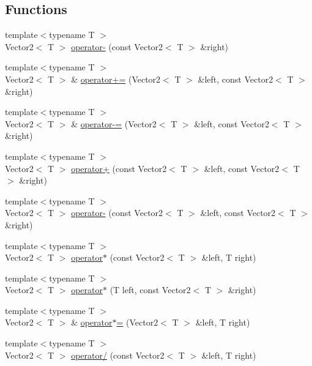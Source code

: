 \subsection*{Functions}
\begin{DoxyCompactItemize}
\item 
{\footnotesize template$<$typename T $>$ }\\Vector2$<$ T $>$ \hyperlink{_vector2_8inl_af6be5729d510689ad3bda16e2ee1052e}{operator-\/} (const Vector2$<$ T $>$ \&right)
\item 
{\footnotesize template$<$typename T $>$ }\\Vector2$<$ T $>$ \& \hyperlink{_vector2_8inl_a52734531787801fca563b63877cf8855}{operator+=} (Vector2$<$ T $>$ \&left, const Vector2$<$ T $>$ \&right)
\item 
{\footnotesize template$<$typename T $>$ }\\Vector2$<$ T $>$ \& \hyperlink{_vector2_8inl_a6dc66f95d609a2280bc5d0e8dc1871ec}{operator-\/=} (Vector2$<$ T $>$ \&left, const Vector2$<$ T $>$ \&right)
\item 
{\footnotesize template$<$typename T $>$ }\\Vector2$<$ T $>$ \hyperlink{_vector2_8inl_a629b6b51cf4ef3d9bef1b471096535c1}{operator+} (const Vector2$<$ T $>$ \&left, const Vector2$<$ T $>$ \&right)
\item 
{\footnotesize template$<$typename T $>$ }\\Vector2$<$ T $>$ \hyperlink{_vector2_8inl_ad844643fc6fb0eea05a382b318ae5259}{operator-\/} (const Vector2$<$ T $>$ \&left, const Vector2$<$ T $>$ \&right)
\item 
{\footnotesize template$<$typename T $>$ }\\Vector2$<$ T $>$ \hyperlink{_vector2_8inl_a4bcfa0548660237aec2f1fdfd000a30f}{operator$\ast$} (const Vector2$<$ T $>$ \&left, T right)
\item 
{\footnotesize template$<$typename T $>$ }\\Vector2$<$ T $>$ \hyperlink{_vector2_8inl_afe4ec033f7e7061b5693a7dbcdecf96e}{operator$\ast$} (T left, const Vector2$<$ T $>$ \&right)
\item 
{\footnotesize template$<$typename T $>$ }\\Vector2$<$ T $>$ \& \hyperlink{_vector2_8inl_af8c6cb01ae7604914f9ea350793712bb}{operator$\ast$=} (Vector2$<$ T $>$ \&left, T right)
\item 
{\footnotesize template$<$typename T $>$ }\\Vector2$<$ T $>$ \hyperlink{_vector2_8inl_a1a55a08f8d786e49995d2b162d0ef922}{operator/} (const Vector2$<$ T $>$ \&left, T right)

\end{DoxyCompactItemize}
